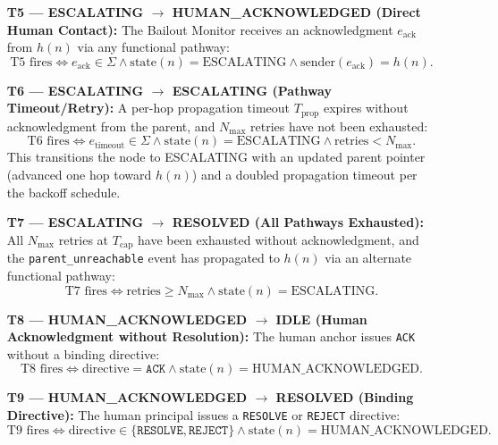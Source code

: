 \begin{enumerate}
\item[\textbf{T5 — ESCALATING $\rightarrow$ HUMAN\_ACKNOWLEDGED (Direct Human Contact):}] The Bailout Monitor receives an acknowledgment $e_{\text{ack}}$ from $h(n)$ via any functional pathway:
\begin{equation}
\text{T5 fires} \iff e_{\text{ack}} \in \Sigma \land \text{state}(n) = \text{ESCALATING} \land \text{sender}(e_{\text{ack}}) = h(n). \tag{T5}
\end{equation}

\item[\textbf{T6 — ESCALATING $\rightarrow$ ESCALATING (Pathway Timeout/Retry):}] A per-hop propagation timeout $T_{\text{prop}}$ expires without acknowledgment from the parent, and $N_{\max}$ retries have not been exhausted:
\begin{equation}
\text{T6 fires} \iff e_{\text{timeout}} \in \Sigma \land \text{state}(n) = \text{ESCALATING} \land \text{retries} < N_{\max}. \tag{T6}
\end{equation}
This transitions the node to ESCALATING with an updated parent pointer (advanced one hop toward $h(n)$) and a doubled propagation timeout per the backoff schedule.

\item[\textbf{T7 — ESCALATING $\rightarrow$ RESOLVED (All Pathways Exhausted):}] All $N_{\max}$ retries at $T_{\text{cap}}$ have been exhausted without acknowledgment, and the \texttt{parent\_unreachable} event has propagated to $h(n)$ via an alternate functional pathway:
\begin{equation}
\text{T7 fires} \iff \text{retries} \geq N_{\max} \land \text{state}(n) = \text{ESCALATING}. \tag{T7}
\end{equation}

\item[\textbf{T8 — HUMAN\_ACKNOWLEDGED $\rightarrow$ IDLE (Human Acknowledgment without Resolution):}] The human anchor issues \texttt{ACK} without a binding directive:
\begin{equation}
\text{T8 fires} \iff \text{directive} = \texttt{ACK} \land \text{state}(n) = \text{HUMAN\_ACKNOWLEDGED}. \tag{T8}
\end{equation}

\item[\textbf{T9 — HUMAN\_ACKNOWLEDGED $\rightarrow$ RESOLVED (Binding Directive):}] The human principal issues a \texttt{RESOLVE} or \texttt{REJECT} directive:
\begin{equation}
\text{T9 fires} \iff \text{directive} \in \{\texttt{RESOLVE}, \texttt{REJECT}\} \land \text{state}(n) = \text{HUMAN\_ACKNOWLEDGED}. \tag{T9}
\end{equation}
\end{enumerate}

